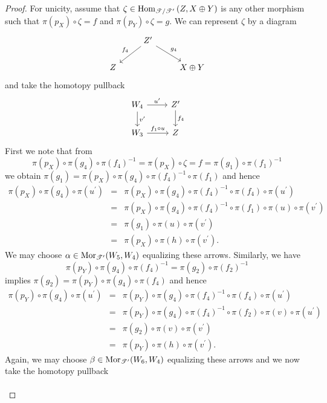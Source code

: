 \documentclass[dissertation.tex]{subfiles}
\begin{document}
\begin{lem}
\begin{proof}
    For unicity, assume that $\zeta \in \Hom{\T/\T^\prime}{Z,X \oplus Y}$ is any other morphism such that $\pi(p_X) \circ \zeta = f$ and $\pi(p_Y) \circ \zeta = g$.
    We can represent $\zeta$ by a diagram
    $$\begin{tikzcd}
      & Z^\prime \arrow[swap]{ld}{f_4}\arrow{rd}{g_4}\\
      Z & & X \oplus Y
    \end{tikzcd}$$
    and take the homotopy pullback
    $$\begin{tikzcd}
      W_4 \arrow{r}{u^\prime}\arrow{d}{v^\prime} & Z^\prime \arrow{d}{f_4}\\
      W_3 \arrow{r}{f_1 \circ u} & Z
    \end{tikzcd}$$
    First we note that from
    $$\pi(p_X) \circ \pi(g_4) \circ \pi(f_4)^{-1} = 
    \pi(p_X) \circ \zeta 
    = f 
    = \pi(g_1) \circ \pi(f_1)^{-1}$$
    we obtain $\pi(g_1) = \pi(p_X) \circ \pi(g_4) \circ \pi(f_4)^{-1} \circ \pi(f_1)$ and hence
    \begin{eqnarray*}
      \pi(p_X) \circ \pi(g_4) \circ \pi(u^\prime) &=&
      \pi(p_X) \circ \pi(g_4) \circ \pi(f_4)^{-1} \circ \pi(f_4) \circ \pi(u^\prime)\\
      &=& \pi(p_X) \circ \pi(g_4) \circ \pi(f_4)^{-1} \circ \pi(f_1) \circ \pi(u) \circ \pi(v^\prime)\\
      &=& \pi(g_1) \circ \pi(u) \circ \pi(v^\prime)\\
      &=& \pi(p_X) \circ \pi(h) \circ \pi(v^\prime).
    \end{eqnarray*}
    We may choose $\alpha \in \Mor{\T^\prime}(W_5,W_4)$ equalizing these arrows.
    Similarly, we have
    $$\pi(p_Y) \circ \pi(g_4) \circ \pi(f_4)^{-1} = \pi(g_2) \circ \pi(f_2)^{-1}$$
    implies $\pi(g_2) = \pi(p_Y) \circ \pi(g_4) \circ \pi(f_4)$
    and hence
    \begin{eqnarray*}
      \pi(p_Y) \circ \pi(g_4) \circ \pi(u^\prime) &=&
      \pi(p_Y) \circ \pi(g_4) \circ \pi(f_4)^{-1} \circ \pi(f_4) \circ \pi(u^\prime)\\
      &=& \pi(p_Y) \circ \pi(g_4) \circ \pi(f_4)^{-1} \circ \pi(f_2) \circ \pi(v) \circ \pi(u^\prime)\\
      &=& \pi(g_2) \circ \pi(v) \circ \pi(v^\prime)\\
      &=& \pi(p_Y) \circ \pi(h) \circ \pi(v^\prime).
    \end{eqnarray*}
    Again, we may choose $\beta \in \Mor{\T^\prime}(W_6,W_4)$ equalizing these arrows and we now take the homotopy pullback
    $$\begin{tikzcd}

\end{tikzcd}$$
\end{proof}
\end{lem}
\end{document}

